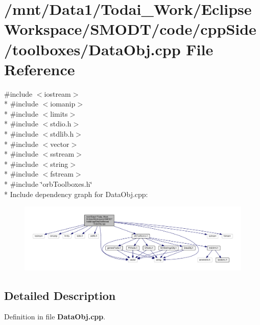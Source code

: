 \section{/mnt/\-Data1/\-Todai\-\_\-\-Work/\-Eclipse\-Workspace/\-S\-M\-O\-D\-T/code/cpp\-Side/toolboxes/\-Data\-Obj.cpp File Reference}
\label{_data_obj_8cpp}
{\ttfamily \#include $<$iostream$>$}\\*
{\ttfamily \#include $<$iomanip$>$}\\*
{\ttfamily \#include $<$limits$>$}\\*
{\ttfamily \#include $<$stdio.\-h$>$}\\*
{\ttfamily \#include $<$stdlib.\-h$>$}\\*
{\ttfamily \#include $<$vector$>$}\\*
{\ttfamily \#include $<$sstream$>$}\\*
{\ttfamily \#include $<$string$>$}\\*
{\ttfamily \#include $<$fstream$>$}\\*
{\ttfamily \#include \char`\"{}orb\-Toolboxes.\-h\char`\"{}}\\*
Include dependency graph for Data\-Obj.\-cpp\-:
\nopagebreak
\begin{figure}[H]
\begin{center}
\leavevmode
\includegraphics[width=350pt]{_data_obj_8cpp__incl}
\end{center}
\end{figure}


\subsection{Detailed Description}


Definition in file {\bf Data\-Obj.\-cpp}.

